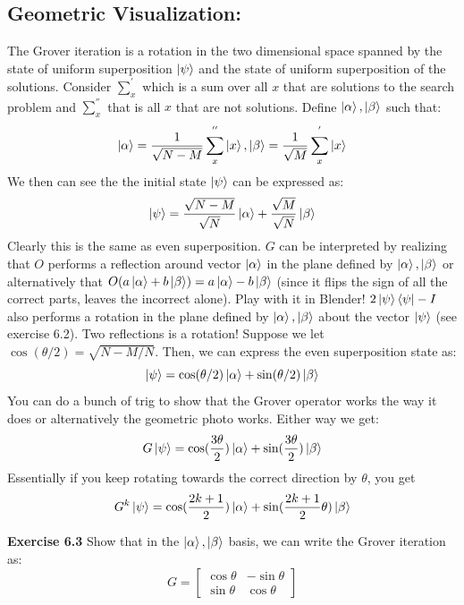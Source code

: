 \documentclass{article}
\begin{document}
\subsection{Geometric Visualization:}
The Grover iteration is a rotation in the two dimensional space spanned by the state of uniform superposition $\ket{\psi}$ and the state of uniform superposition of the solutions. Consider $\sum_{x}^{'}$ which is a sum over all $x$ that are solutions to the search problem and $\sum_x^{''}$ that is all $x$ that are not solutions. Define $\ket{\alpha}, \ket{\beta}$ such that:
$$\ket{\alpha} = \frac{1}{\sqrt{N-M}} \sum_x^{''} \ket{x}, \ket{\beta} = \frac{1}{\sqrt{M}} \sum_{x}^{'} \ket{x}$$
We then can see the the initial state $\ket{\psi}$ can be expressed as:
$$\ket{\psi} = \frac{\sqrt{N-M}}{\sqrt{N}} \ket{\alpha} + \frac{\sqrt{M}}{\sqrt{N}}\ket{\beta}$$
Clearly this is the same as even superposition. $G$ can be interpreted by realizing that $O$ performs a reflection around vector $\ket{\alpha}$ in the plane defined by $\ket{\alpha}, \ket{\beta}$ or alternatively that $O(a\ket{\alpha} + b\ket{\beta}) = a\ket{\alpha} - b\ket{\beta}$ (since it flips the sign of all the correct parts, leaves the incorrect alone). Play with it in Blender! $2\ket{\psi}\bra{\psi} - I$ also performs a rotation in the plane defined by $\ket{\alpha}, \ket{\beta}$ about the vector $\ket{\psi}$ (see exercise 6.2). Two reflections is a rotation! Suppose we let $\cos (\theta/2) = \sqrt{N-M/N}$. Then, we can express the even superposition state as:
$$\ket{\psi} = \cos (\theta/2) \ket{\alpha} + \sin (\theta/2) \ket{\beta}$$
You can do a bunch of trig to show that the Grover operator works the way it does or alternatively the geometric photo works. Either way we get:
$$G\ket{\psi} = \cos (\frac{3\theta}{2})\ket{\alpha} + \sin (\frac{3\theta}{2})\ket{\beta}$$ 
Essentially if you keep rotating towards the correct direction by $\theta$, you get 
$$G^k \ket{\psi} = \cos (\frac{2k+1}{2})\ket{\alpha} + \sin (\frac{2k+1}{2}\theta)\ket{\beta}$$
\begin{tcolorbox}\textbf{Exercise 6.3} Show that in the $\ket{\alpha}, \ket{\beta}$ basis, we can write the Grover iteration as:
	$$G = \begin{bmatrix}  \cos \theta & - \sin \theta \\ \sin \theta & \cos \theta\end{bmatrix}$$
\end{tcolorbox}
\end{document}

